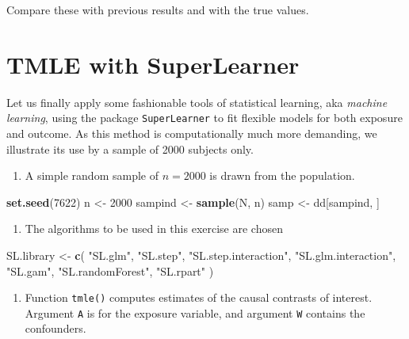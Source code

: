 \documentclass[
]{book}
\newenvironment{Shaded}{\begin{snugshade}}{\end{snugshade}}
\newcommand{\DecValTok}[1]{\textcolor[rgb]{0.00,0.00,0.81}{#1}}
\newcommand{\FunctionTok}[1]{\textcolor[rgb]{0.13,0.29,0.53}{\textbf{#1}}}
\newcommand{\NormalTok}[1]{#1}
\newcommand{\OtherTok}[1]{\textcolor[rgb]{0.56,0.35,0.01}{#1}}
\newcommand{\StringTok}[1]{\textcolor[rgb]{0.31,0.60,0.02}{#1}}
\providecommand{\tightlist}{%
  \setlength{\itemsep}{0pt}\setlength{\parskip}{0pt}}
\begin{document}
Compare these with previous results and with the true values.

\section{TMLE with SuperLearner}\label{tmle-with-superlearner}

Let us finally apply some
fashionable tools of statistical learning, aka \emph{machine learning},
using the package \texttt{SuperLearner} to fit flexible models
for both exposure and outcome.
As this method is computationally much
more demanding,
we illustrate its use by a sample of 2000 subjects only.

\begin{enumerate}
\def\labelenumi{\arabic{enumi}.}
\tightlist
\item
  A simple random sample of \(n=2000\) is drawn from the population.
\end{enumerate}

\begin{Shaded}
\begin{Highlighting}[]
\FunctionTok{set.seed}\NormalTok{(}\DecValTok{7622}\NormalTok{)}
\NormalTok{n }\OtherTok{\textless{}{-}} \DecValTok{2000}
\NormalTok{sampind }\OtherTok{\textless{}{-}} \FunctionTok{sample}\NormalTok{(N, n)}
\NormalTok{samp }\OtherTok{\textless{}{-}}\NormalTok{ dd[sampind, ]}
\end{Highlighting}
\end{Shaded}

\begin{enumerate}
\def\labelenumi{\arabic{enumi}.}
\setcounter{enumi}{1}
\tightlist
\item
  The algorithms to be used in this exercise are chosen
\end{enumerate}

\begin{Shaded}
\begin{Highlighting}[]
\NormalTok{SL.library }\OtherTok{\textless{}{-}} \FunctionTok{c}\NormalTok{(}
  \StringTok{"SL.glm"}\NormalTok{, }\StringTok{"SL.step"}\NormalTok{, }\StringTok{"SL.step.interaction"}\NormalTok{,}
  \StringTok{"SL.glm.interaction"}\NormalTok{, }\StringTok{"SL.gam"}\NormalTok{,}
  \StringTok{"SL.randomForest"}\NormalTok{, }\StringTok{"SL.rpart"}
\NormalTok{)}
\end{Highlighting}
\end{Shaded}

\begin{enumerate}
\def\labelenumi{\arabic{enumi}.}
\setcounter{enumi}{2}
\tightlist
\item
  Function \texttt{tmle()} computes estimates of the causal contrasts of interest.
  Argument \texttt{A} is for the exposure variable, and
  argument \texttt{W} contains the confounders.
\end{enumerate}
\end{document}
